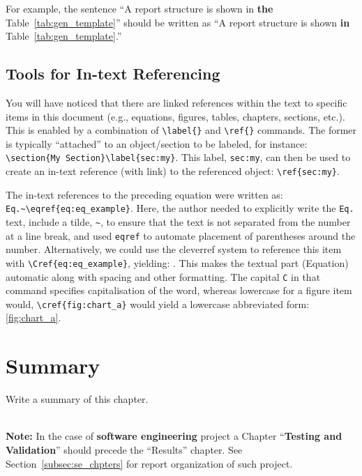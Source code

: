 For example, the sentence ``A report structure is shown in \textbf{the} Table~\ref{tab:gen_template}'' should be written as ``A report structure is shown \textbf{in} Table~\ref{tab:gen_template}.'' 

\subsection{Tools for In-text Referencing}\label{subsec:reftools}
You will have noticed that there are linked references within the text to specific items in this document (e.g., equations, figures, tables, chapters, sections, etc.).  This is enabled by a combination of \verb|\label{}| and \verb|\ref{}| commands.  The former is typically ``attached'' to an object/section to be labeled, for instance: \lstinline!\section{My Section}\label{sec:my}!.  This label, \verb|sec:my|, can then be used to create an in-text reference (with link) to the referenced object: \verb|\ref{sec:my}|.

The in-text references to the preceding equation were written as: \lstinline!Eq.~\eqref{eq:eq_example}!.  Here, the author needed to explicitly write the \verb|Eq.| text, include a tilde, \verb|~|, to ensure that the text is not separated from the number at a line break, and used \verb|eqref| to automate placement of parentheses around the number.  Alternatively, we could use the cleverref system to reference this item with \verb|\Cref{eq:eq_example}|, yielding: .  This makes the textual part (Equation) automatic along with spacing and other formatting.  The capital \verb|C| in that command specifies capitalisation of the word, whereas lowercase for a figure item would, \verb|\cref{fig:chart_a}| would yield a lowercase abbreviated form: \cref{fig:chart_a}.

\section{Summary}
Write a summary of this chapter.

~\\[5em]
\noindent
{\huge\textbf{Note:}} In the case of \textbf{software engineering} project a Chapter ``\textbf{Testing and Validation}'' should precede the ``Results'' chapter. See Section~\ref{subsec:se_chpters} for report organization of such project. 

